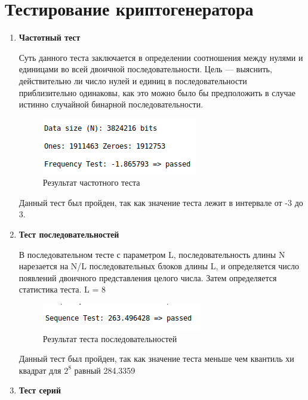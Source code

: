 \documentclass{article}
\begin{document}
\section{Тестирование криптогенератора}
\begin{enumerate}
\item \textbf{Частотный тест}

Суть данного теста заключается в определении соотношения между нулями и единицами во всей двоичной последовательности. Цель — выяснить, действительно ли число нулей и единиц в последовательности приблизительно одинаковы, как это можно было бы предположить в случае истинно случайной бинарной последовательности.

\begin{figure}[H]
    \begin{flushleft} \centerline{\includegraphics[scale=0.7]{freqtest.png}}
        \caption{Результат частотного теста}
    \end{flushleft}
\end{figure}

Данный тест был пройден, так как значение теста лежит в интервале от -3 до 3.

\item \textbf{Тест последовательностей}

В последовательном тесте с параметром L, последовательность длины N нарезается на N/L последовательных блоков длины L, и определяется число появлений двоичного представления целого числа. Затем определяется статистика теста.
L = 8
\begin{figure}[H]
    \begin{flushleft} \centerline{\includegraphics[scale=0.7]{seqtest.png}}
        \caption{Результат теста последовательностей}
    \end{flushleft}
\end{figure}

Данный тест был пройден, так как значение теста меньше чем квантиль хи квадрат для $2^8$ равный 284.3359

\item \textbf{Тест серий}


\end{enumerate}
\end{document}

